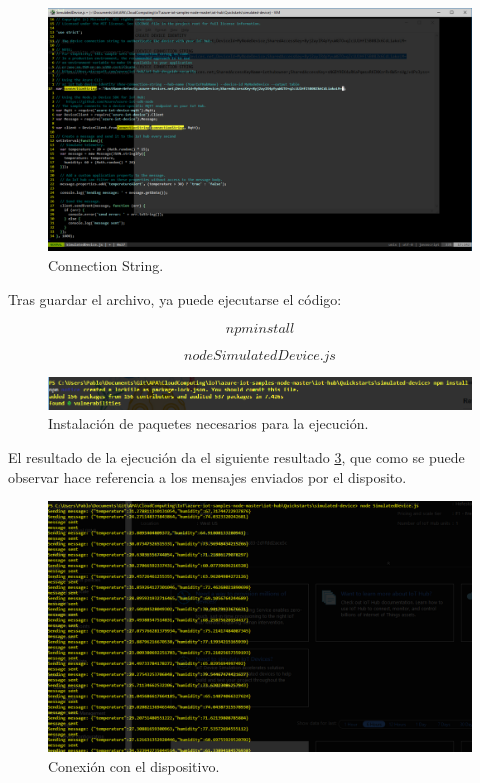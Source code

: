 \documentclass[10pt]{article}
\begin{document}
\begin{figure}[h!]
 \includegraphics[width=\linewidth]{./IoT/MicrosoftAzure/4-2_send_simulated_telemetry.png}
 \caption{Connection String.}
 \label{directory}
\end{figure}

Tras guardar el archivo, ya puede ejecutarse el código:

\begin{equation}
 \label{ejecdev1}
npm install
\end{equation}

\begin{equation}
 \label{ejecdev2}
node SimulatedDevice.js
\end{equation}

\begin{figure}[h!]
 \includegraphics[width=\linewidth]{./IoT/MicrosoftAzure/4-4_send_simulated_telemetry.png}
 \caption{Instalación de paquetes necesarios para la ejecución.}
 \label{npmdev}
\end{figure}

El resultado de la ejecución da el siguiente resultado
\hyperref[nodedev]{\ref{nodedev}}, que como se puede observar hace referencia a 
los mensajes enviados por el disposito.

\begin{figure}[h!]
 \includegraphics[width=\linewidth]{./IoT/MicrosoftAzure/4-5_send_simulated_telemetry.png}
 \caption{Conexión con el dispositivo.}
 \label{nodedev}
\end{figure}
\end{document}
